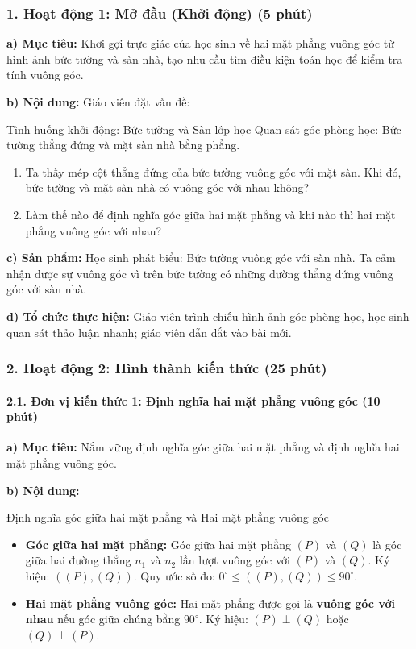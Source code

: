 \documentclass[12pt, a4paper]{article}
\begin{document}
\subsubsection*{1. Hoạt động 1: Mở đầu (Khởi động) (5 phút)}

\noindent \textbf{a) Mục tiêu:}
Khơi gợi trực giác của học sinh về hai mặt phẳng vuông góc từ hình ảnh bức tường và sàn nhà, tạo nhu cầu tìm điều kiện toán học để kiểm tra tính vuông góc.

\noindent \textbf{b) Nội dung:}
Giáo viên đặt vấn đề:
\begin{pedabox}{Tình huống khởi động: Bức tường và Sàn lớp học}
Quan sát góc phòng học: Bức tường thẳng đứng và mặt sàn nhà bằng phẳng.
\begin{enumerate}[leftmargin=0.6cm]
    \item Ta thấy mép cột thẳng đứng của bức tường vuông góc với mặt sàn. Khi đó, bức tường và mặt sàn nhà có vuông góc với nhau không?
    \item Làm thế nào để định nghĩa góc giữa hai mặt phẳng và khi nào thì hai mặt phẳng vuông góc với nhau?
\end{enumerate}
\end{pedabox}

\noindent \textbf{c) Sản phẩm:}
Học sinh phát biểu: Bức tường vuông góc với sàn nhà. Ta cảm nhận được sự vuông góc vì trên bức tường có những đường thẳng đứng vuông góc với sàn nhà.

\noindent \textbf{d) Tổ chức thực hiện:}
Giáo viên trình chiếu hình ảnh góc phòng học, học sinh quan sát thảo luận nhanh; giáo viên dẫn dắt vào bài mới.

\subsubsection*{2. Hoạt động 2: Hình thành kiến thức (25 phút)}

\paragraph{2.1. Đơn vị kiến thức 1: Định nghĩa hai mặt phẳng vuông góc (10 phút)}

\noindent \textbf{a) Mục tiêu:}
Nắm vững định nghĩa góc giữa hai mặt phẳng và định nghĩa hai mặt phẳng vuông góc.

\noindent \textbf{b) Nội dung:}
\begin{pedabox}{Định nghĩa góc giữa hai mặt phẳng và Hai mặt phẳng vuông góc}
\begin{itemize}[leftmargin=0.6cm]
    \item \textbf{Góc giữa hai mặt phẳng:} Góc giữa hai mặt phẳng $(P)$ và $(Q)$ là góc giữa hai đường thẳng $n_1$ và $n_2$ lần lượt vuông góc với $(P)$ và $(Q)$.
    Ký hiệu: $((P), (Q))$. Quy ước số đo: $0^\circ \le ((P), (Q)) \le 90^\circ$.
    \item \textbf{Hai mặt phẳng vuông góc:} Hai mặt phẳng được gọi là \textbf{vuông góc với nhau} nếu góc giữa chúng bằng $90^\circ$.
    Ký hiệu: $(P) \perp (Q)$ hoặc $(Q) \perp (P)$.
\end{itemize}
\end{pedabox}
\end{document}
